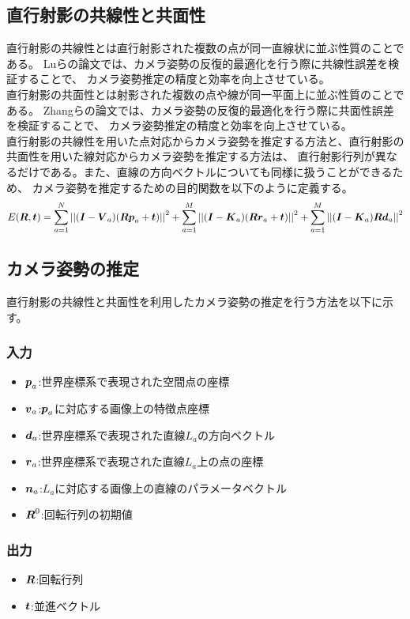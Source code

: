 \documentclass[]{jarticle}          %
\begin{document}
\subsection{直行射影の共線性と共面性}
直行射影の共線性とは直行射影された複数の点が同一直線状に並ぶ性質のことである。
Luらの論文では、カメラ姿勢の反復的最適化を行う際に共線性誤差を検証することで、
カメラ姿勢推定の精度と効率を向上させている。
\\
直行射影の共面性とは射影された複数の点や線が同一平面上に並ぶ性質のことである。
Zhangらの論文では、カメラ姿勢の反復的最適化を行う際に共面性誤差を検証することで、
カメラ姿勢推定の精度と効率を向上させている。
\\
直行射影の共線性を用いた点対応からカメラ姿勢を推定する方法と、直行射影の共面性を用いた線対応からカメラ姿勢を推定する方法は、
直行射影行列が異なるだけである。また、直線の方向ベクトルについても同様に扱うことができるため、
カメラ姿勢を推定するための目的関数を以下のように定義する。
\begin{equation}
  E(\mbox{\boldmath $R$},\mbox{\boldmath $t$})=\sum^N_{a=1}{||(\mbox{\boldmath $I$}-\mbox{\boldmath $V$}_a)(\mbox{\boldmath $R$}\mbox{\boldmath $p$}_a+\mbox{\boldmath $t$})||}^2+\sum^M_{a=1}{||(\mbox{\boldmath $I$}-\mbox{\boldmath $K$}_a)(\mbox{\boldmath $R$}\mbox{\boldmath $r$}_a+\mbox{\boldmath $t$})||}^2+\sum^M_{a=1}{||(\mbox{\boldmath $I$}-\mbox{\boldmath $K$}_a)\mbox{\boldmath $R$}\mbox{\boldmath $d$}_a||}^2
\end{equation}
\subsection{カメラ姿勢の推定}
直行射影の共線性と共面性を利用したカメラ姿勢の推定を行う方法を以下に示す。
\subsubsection{入力}
\begin{itemize}
  \item $\mbox{\boldmath $p$}_a$:世界座標系で表現された空間点の座標
  \item $\mbox{\boldmath $v$}_a$:$\mbox{\boldmath $p$}_a$に対応する画像上の特徴点座標
  \item $\mbox{\boldmath $d$}_a$:世界座標系で表現された直線$L_a$の方向ベクトル
  \item $\mbox{\boldmath $r$}_a$:世界座標系で表現された直線$L_a$上の点の座標
  \item $\mbox{\boldmath $n$}_a$:$L_a$に対応する画像上の直線のパラメータベクトル
  \item $\mbox{\boldmath $R$}^0$:回転行列の初期値
\end{itemize}
\subsubsection{出力}
\begin{itemize}
  \item $\mbox{\boldmath $R$}$:回転行列
  \item $\mbox{\boldmath $t$}$:並進ベクトル
\end{itemize}
\end{document}
